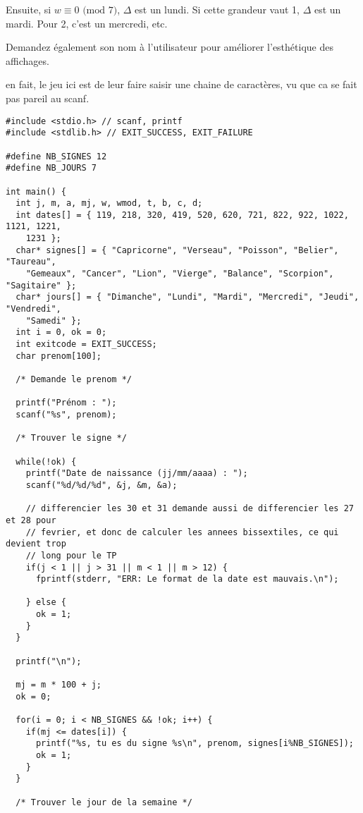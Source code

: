 \documentclass[10pt]{article}\usepackage[enonce]{exemptty}
\begin{document}
Ensuite, si $w\equiv 0\textrm{ (mod }7)$, $\Delta$ est un lundi. Si cette
grandeur vaut 1, $\Delta$ est un mardi. Pour 2, c'est un mercredi, etc.

\Question Demandez également son nom à l'utilisateur pour améliorer
l'esthétique des affichages.

\begin{Reponse}
  en fait, le jeu ici est de leur faire saisir une chaine de caractères, vu que
  ca se fait pas pareil au scanf.

\bigskip\noindent\begin{minipage}{\linewidth}
  \begin{Verbatim}[label=Reponse aux 3 questions de l'exercice 2 proposee par Julien]
#include <stdio.h> // scanf, printf
#include <stdlib.h> // EXIT_SUCCESS, EXIT_FAILURE

#define NB_SIGNES 12
#define NB_JOURS 7

int main() {
  int j, m, a, mj, w, wmod, t, b, c, d;
  int dates[] = { 119, 218, 320, 419, 520, 620, 721, 822, 922, 1022, 1121, 1221,
	1231 };
  char* signes[] = { "Capricorne", "Verseau", "Poisson", "Belier", "Taureau",
	"Gemeaux", "Cancer", "Lion", "Vierge", "Balance", "Scorpion", "Sagitaire" };
  char* jours[] = { "Dimanche", "Lundi", "Mardi", "Mercredi", "Jeudi", "Vendredi",
	"Samedi" };
  int i = 0, ok = 0; 
  int exitcode = EXIT_SUCCESS;
  char prenom[100];

  /* Demande le prenom */

  printf("Prénom : ");
  scanf("%s", prenom);

  /* Trouver le signe */

  while(!ok) {
    printf("Date de naissance (jj/mm/aaaa) : ");
    scanf("%d/%d/%d", &j, &m, &a);
  
    // differencier les 30 et 31 demande aussi de differencier les 27 et 28 pour
    // fevrier, et donc de calculer les annees bissextiles, ce qui devient trop
    // long pour le TP
    if(j < 1 || j > 31 || m < 1 || m > 12) {
      fprintf(stderr, "ERR: Le format de la date est mauvais.\n");

    } else {
      ok = 1;
    }
  }

  printf("\n");

  mj = m * 100 + j;
  ok = 0;

  for(i = 0; i < NB_SIGNES && !ok; i++) {
    if(mj <= dates[i]) {
      printf("%s, tu es du signe %s\n", prenom, signes[i%NB_SIGNES]);
      ok = 1;
    }
  }

  /* Trouver le jour de la semaine */


\end{Verbatim}
\end{minipage}
\end{Reponse}
\end{document}
